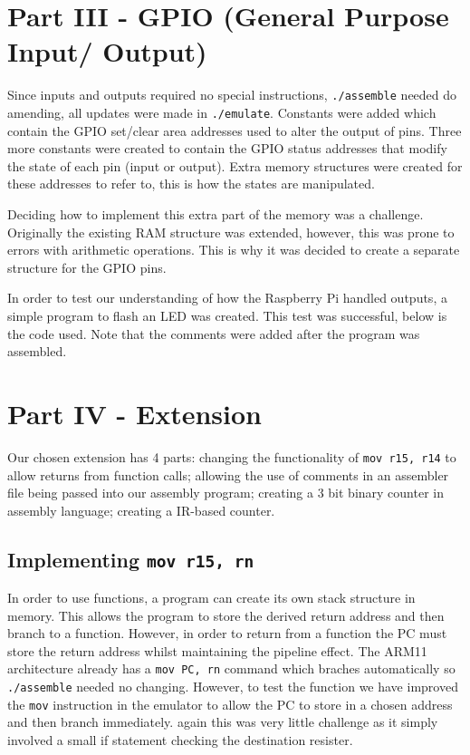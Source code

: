 \documentclass[11pt]{article}
\begin{document}
\section{Part III - GPIO (General Purpose Input/ Output)}
Since inputs and outputs required no special instructions, \texttt{./assemble} needed do amending, all updates were made in \texttt{./emulate}. Constants were added which contain the GPIO set/clear area addresses used to alter the output of pins. Three more constants were created to contain the GPIO status addresses that modify the state of each pin (input or output). Extra memory structures were created for these addresses to refer to, this is how the states are manipulated.\newline

\noindent Deciding how to implement this extra part of the memory was a challenge. Originally the existing RAM structure was extended, however, this was prone to errors with arithmetic operations. This is why it was decided to create a separate structure for the GPIO pins.\newline

\noindent In order to test our understanding of how the Raspberry Pi handled outputs, a simple program to flash an LED was created. This test was successful, below is the code used. Note that the comments were added after the program was assembled.



\section{Part IV - Extension}

Our chosen extension has 4 parts: changing the functionality of \texttt{mov r15, r14} to allow returns from function calls; allowing the use of comments in an assembler file being passed into our assembly program; creating a 3 bit binary counter in assembly language; creating a IR-based counter. \newline

\subsection{Implementing \texttt{mov r15, rn}}
In order to use functions, a program can create its own stack structure in memory. This allows the program to store the derived return address and then branch to a function. However, in order to return from a function the PC must store the return address whilst maintaining the pipeline effect. The ARM11 architecture already has a \texttt{mov PC, rn} command which braches automatically so \texttt{./assemble} needed no changing. However, to test the function we have improved the \texttt{mov} instruction in the emulator to allow the PC to store in a chosen address and then branch immediately. again this was very little challenge as it simply involved a small if statement checking the destination resister.
\end{document}
